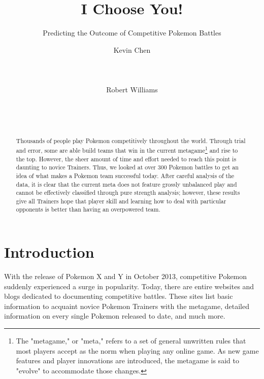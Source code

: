 \documentclass{acm_proc_article-sp}
\begin{document}
\title{I Choose You!}
\subtitle{Predicting the Outcome of Competitive Pokemon Battles}


\author{
\alignauthor
Kevin Chen\\
       \\
       \\
       \\
\alignauthor
Robert Williams\\
       \\
       \\
       \\
}

\maketitle
\begin{abstract}
Thousands of people play Pokemon competitively throughout the world. Through trial and error, some are able build teams that win in the current metagame\footnote{The "metagame," or "meta," refers to a set of general unwritten rules that most players accept as the norm when playing any online game. As new game features and player innovations are introduced, the metagame is said to "evolve" to accommodate those changes.} and rise to the top. However, the sheer amount of time and effort needed to reach this point is daunting to novice Trainers. Thus, we looked at over 300 Pokemon battles to get an idea of what makes a Pokemon team successful today. After careful analysis of the data, it is clear that the current meta does not feature grossly unbalanced play and cannot be effectively classified through pure strength analysis; however, these results give all Trainers hope that player skill and learning how to deal with particular opponents is better than having an overpowered team.
\end{abstract}


\section{Introduction}
With the release of Pokemon X and Y in October 2013, competitive Pokemon suddenly experienced a surge in popularity. Today, there are entire websites and blogs dedicated to documenting competitive battles. These sites list basic information to acquaint novice Pokemon Trainers with the metagame, detailed information on every single Pokemon released to date, and much more.
\end{document}
